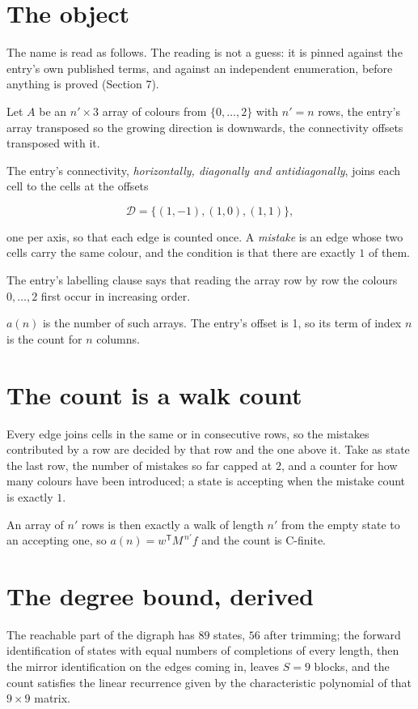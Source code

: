 \documentclass[11pt]{article}
\theoremstyle{definition}
\begin{document}
\section{The object}

The name is read as follows. The reading is not a guess: it is pinned against the entry's own published terms, and against an independent enumeration, before anything is proved (Section 7).

Let $A$ be an $n' \times 3$ array of colours from $\{0,\dots,2\}$ with $n' = n$ rows, the entry's array transposed so the growing direction is downwards, the connectivity offsets transposed with it.

The entry's connectivity, {\itshape horizontally, diagonally and antidiagonally}, joins each cell to the cells at the offsets

\[\mathcal{D} = \{(1,-1), (1,0), (1,1)\},\]

one per axis, so that each edge is counted once. A {\itshape mistake} is an edge whose two cells carry the same colour, and the condition is that there are exactly $1$ of them.

The entry's labelling clause says that reading the array row by row the colours $0,\dots,2$ first occur in increasing order.

$a(n)$ is the number of such arrays. The entry's offset is 1, so its term of index $n$ is the count for $n$ columns.

\section{The count is a walk count}

Every edge joins cells in the same or in consecutive rows, so the mistakes contributed by a row are decided by that row and the one above it. Take as state the last row, the number of mistakes so far capped at $2$, and a counter for how many colours have been introduced; a state is accepting when the mistake count is exactly $1$.

An array of $n'$ rows is then exactly a walk of length $n'$ from the empty state to an accepting one, so $a(n) = w^{\mathsf T}M^{\,n'}f$ and the count is C-finite.

\section{The degree bound, derived}

The reachable part of the digraph has $89$ states, $56$ after trimming; the forward identification of states with equal numbers of completions of every length, then the mirror identification on the edges coming in, leaves $S = 9$ blocks, and the count satisfies the linear recurrence given by the characteristic polynomial of that $9\times9$ matrix.
\end{document}
